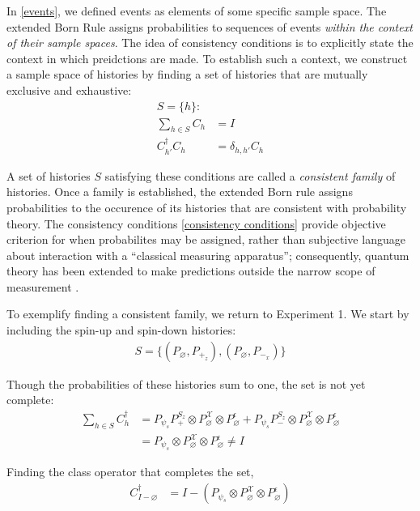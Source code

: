 In \autoref{events}, we defined events as elements of some specific sample space. The extended Born Rule assigns probabilities to sequences of events \textit{within the context of their sample spaces}. The idea of consistency conditions is to explicitly state the context in which preidctions are made. To establish such a context, we construct a sample space of histories by finding a set of histories that are mutually exclusive and exhaustive:
\begin{align} \label{consistency conditions}
  S = \{h \}: \\ \nonumber
  \sum_{h \in S} C_h &= I \\ \nonumber
  C_{h'}^\dagger C_h &= \delta_{h,h'} C_h
\end{align}

A set of histories $S$ satisfying these conditions are called a \textit{consistent family} of histories. Once a family is established, the extended Born rule assigns probabilities to the occurence of its histories that are consistent with probability theory. The consistency conditions \autoref{consistency conditions} provide objective criterion for when probabilites may be assigned, rather than subjective language about interaction with a ``classical measuring apparatus''; consequently, quantum theory has been extended to make predictions outside the narrow scope of measurement \cite{Craig}.

To exemplify finding a consistent family, we return to Experiment 1. We start by including the spin-up and spin-down histories:
\begin{align}
  S = \{ \left(P_\varnothing, P_{+_z} \right), \left(P_\varnothing, P_{-_x} \right)\}
\end{align}

Though the probabilities of these histories sum to one, the set is not yet complete:
\begin{align}
  \sum_{h \in S} C_h^\dagger &= P_{\psi_s} P^{S_z}_+ \otimes P^\mathcal{X}_\varnothing \otimes P^\epsilon_\varnothing + P_{\psi_s} P^{S_z}_- \otimes P^\mathcal{X}_\varnothing \otimes P^\epsilon_\varnothing \\ \nonumber
  &= P_{\psi_s} \otimes P^\mathcal{X}_\varnothing \otimes P^\epsilon_\varnothing \neq I
\end{align}

Finding the class operator that completes the set,
\begin{align}
  C^\dagger_{I-\varnothing} &= I - \left(P_{\psi_s} \otimes P^\mathcal{X}_\varnothing \otimes P^\epsilon_\varnothing \right)
\end{align}

